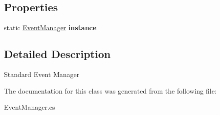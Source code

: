 \subsection*{Properties}
\begin{DoxyCompactItemize}
\item 
\mbox{\label{class_event_manager_a48dc961602569f67255381442e7bbd2d}} 
static \hyperlink{class_event_manager}{Event\+Manager} {\bfseries instance}
\end{DoxyCompactItemize}


\subsection{Detailed Description}
Standard Event Manager 



The documentation for this class was generated from the following file\+:\begin{DoxyCompactItemize}
\item 
Event\+Manager.\+cs\end{DoxyCompactItemize}
